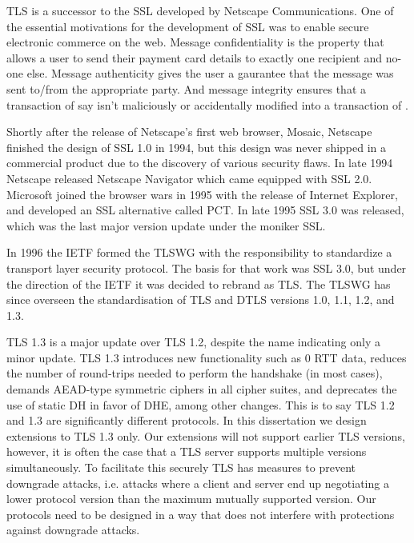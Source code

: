 \ac{TLS} is a successor to the \ac{SSL} developed
by Netscape Communications.
One of the essential motivations for the development of \ac{SSL}
was to enable secure electronic commerce on the web.
Message confidentiality is the property that allows a user
to send their payment card details to exactly one recipient and no-one else.
Message authenticity gives the user a gaurantee that the message
was sent to/from the appropriate party.
And message integrity ensures that a transaction of say  isn't
maliciously or accidentally modified into a transaction of .

Shortly after the release of Netscape's first web browser, Mosaic,
Netscape finished the design of \ac{SSL} 1.0 in 1994,
but this design was never shipped in a commercial product
due to the discovery of various security flaws.
In late 1994 Netscape released Netscape Navigator which
came equipped with \ac{SSL} 2.0.
Microsoft joined the browser wars in 1995 with the release
of Internet Explorer, and developed an \ac{SSL} alternative
called \ac{PCT}.
In late 1995 \ac{SSL} 3.0 was released, which was the last
major version update under the moniker \ac{SSL}.

In 1996 the \ac{IETF} formed the \ac{TLSWG} with
the responsibility to standardize a transport layer security
protocol.
The basis for that work was \ac{SSL} 3.0, but
under the direction of the \ac{IETF} it was decided to rebrand as \ac{TLS}.
The \ac{TLSWG} has since overseen the standardisation of
\ac{TLS} and \ac{DTLS} versions 1.0, 1.1, 1.2, and 1.3.

\ac{TLS} 1.3 is a major update over \ac{TLS} 1.2, despite
the name indicating only a minor update.
\ac{TLS} 1.3 introduces new functionality such as 0 \ac{RTT} data,
reduces the number of round-trips needed to perform the handshake (in most cases),
demands \ac{AEAD}-type symmetric ciphers in all cipher suites,
and deprecates the use of static \ac{DH} in favor of \ac{DHE},
among other changes.
This is to say \ac{TLS} 1.2 and 1.3 are significantly different protocols.
In this dissertation we design extensions to \ac{TLS} 1.3 only.
Our extensions will not support earlier \ac{TLS} versions,
however, it is often the case that
a \ac{TLS} server supports multiple versions simultaneously.
To facilitate this securely \ac{TLS} has measures
to prevent downgrade attacks, i.e. attacks where
a client and server end up negotiating a lower protocol
version than the maximum mutually supported version.
Our protocols need to be designed in a way that does
not interfere with protections against downgrade attacks. %

